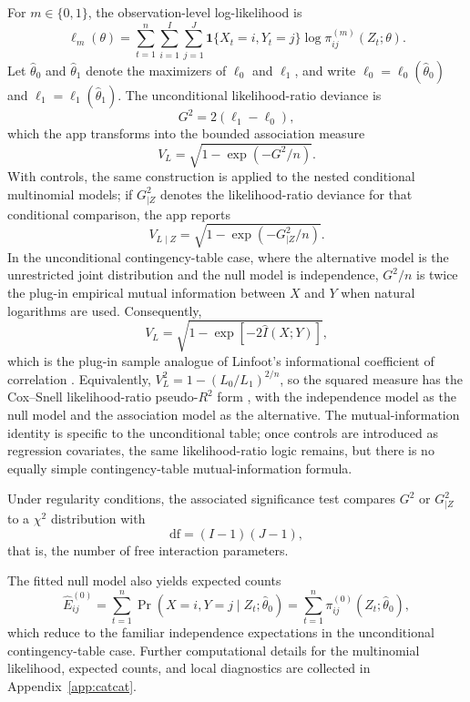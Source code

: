 \documentclass[11pt]{article}
\begin{document}
For $m \in \{0,1\}$, the observation-level log-likelihood is
\begin{equation}
\ell_m(\theta) =
\sum_{t=1}^{n}\sum_{i=1}^{I}\sum_{j=1}^{J}
\mathbf{1}\{X_t=i, Y_t=j\}
\log \pi^{(m)}_{ij}(Z_t;\theta).
\label{eq:loglik}
\end{equation}
Let $\widehat{\theta}_0$ and $\widehat{\theta}_1$ denote the maximizers of
$\ell_0$ and $\ell_1$, and write $\ell_0 = \ell_0(\widehat{\theta}_0)$ and
$\ell_1 = \ell_1(\widehat{\theta}_1)$. The unconditional likelihood-ratio
deviance is
\begin{equation*}
G^2 = 2(\ell_1 - \ell_0),
\end{equation*}
which the app transforms into the bounded association measure
\begin{equation*}
V_L = \sqrt{1 - \exp(-G^2/n)}.
\end{equation*}
With controls, the same construction is applied to the nested conditional
multinomial models; if $G^2_{\mid Z}$ denotes the likelihood-ratio deviance
for that conditional comparison, the app reports
\begin{equation*}
V_{L\mid Z} = \sqrt{1 - \exp(-G^2_{\mid Z}/n)}.
\end{equation*}
In the unconditional contingency-table case, where the alternative model is the
unrestricted joint distribution and the null model is independence, $G^2/n$ is
twice the plug-in empirical mutual information between $X$ and $Y$ when natural
logarithms are used. Consequently,
\[
V_L = \sqrt{1-\exp[-2\widehat I(X;Y)]},
\]
which is the plug-in sample analogue of Linfoot's informational coefficient of
correlation \citep{Linfoot1957}. Equivalently,
$V_L^2 = 1 - (L_0/L_1)^{2/n}$, so the squared measure has the Cox--Snell
likelihood-ratio pseudo-$R^2$ form \citep{CoxSnell1989}, with the independence
model as the null model and the association model as the alternative. The
mutual-information identity is specific to the unconditional table; once
controls are introduced as regression covariates, the same likelihood-ratio
logic remains, but there is no equally simple contingency-table
mutual-information formula.

Under regularity conditions, the associated significance test compares $G^2$
or $G^2_{\mid Z}$ to a $\chi^2$ distribution with
\begin{equation*}
\mathrm{df} = (I-1)(J-1),
\end{equation*}
that is, the number of free interaction parameters.

The fitted null model also yields expected counts
\begin{equation}
\widehat{E}^{(0)}_{ij}
=
\sum_{t=1}^{n}\Pr(X=i, Y=j \mid Z_t; \widehat{\theta}_0)
=
\sum_{t=1}^{n}\pi^{(0)}_{ij}(Z_t; \widehat{\theta}_0),
\label{eq:e0}
\end{equation}
which reduce to the familiar independence expectations in the unconditional
contingency-table case. Further computational details for the multinomial
likelihood, expected counts, and local diagnostics are collected in
Appendix~\ref{app:catcat}.
\end{document}
